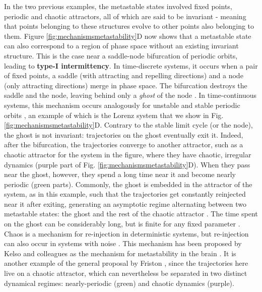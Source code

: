 \documentclass[reprint,superscriptaddress,showpacs,amsmath,amssymb,aps,floatfix,nolongbibliography]{revtex4-2}
\theoremstyle{definition}
\newcommand{\Emph}[1]{\textbf{#1}}
\begin{document}
In the two previous examples, the metastable states involved fixed points, periodic and chaotic attractors, all of which are said to be invariant - meaning that points belonging to these structures evolve to other points also belonging to them. Figure \ref{fig:mechanismsmetastability}D now shows that a metastable state can also correspond to a region of phase space without an existing invariant structure. This is the case near a saddle-node bifurcation of periodic orbits, leading to \Emph{type-I intermittency}. In time-discrete systems, it occurs when a pair of fixed points, a saddle (with attracting and repelling directions) and a node (only attracting directions) merge in phase space. The bifurcation destroys the saddle and the node, leaving behind only a \textit{ghost} of the node \cite{pomeau1979intermittency, pomeau1980intermittent, strogatz2002nonlinear}. In time-continuous systems, this mechanism occurs analogously for unstable and stable periodic orbits  \cite{medeiros2016trapping}, an example of which is the Lorenz system that we show in Fig. \ref{fig:mechanismsmetastability}D. Contrary to the stable limit cycle (or the node), the ghost is not invariant: trajectories on the ghost eventually exit it. Indeed, after the bifurcation, the trajectories converge to another attractor, such as a chaotic attractor for the system in the figure, where they have chaotic, irregular dynamics (purple part of Fig. \ref{fig:mechanismsmetastability}D). When they pass near the ghost, however, they spend a long time near it and become nearly periodic (green parts). Commonly, the ghost is embedded in the attractor of the system, as in this example, such that the trajectories get constantly reinjected near it after exiting, generating an asymptotic regime alternating between two metastable states: the ghost and the rest of the chaotic attractor \cite{pomeau1980intermittent}. The time spent on the ghost can be considerably long, but is finite for any fixed parameter \cite{pomeau1980intermittent}.
Chaos is a mechanism for re-injection in deterministic systems, but re-injection can also occur in systems with noise \cite{medeiros2016trapping}. 
This mechanism has been proposed by Kelso and colleagues as the mechanism for metastability in the brain \cite{kelso1991an, tognoli2014metastable}. It is another example of the general proposal by Friston \cite{friston2000transients}, since the trajectories here live on a chaotic attractor, which can nevertheless be separated in two distinct dynamical regimes: nearly-periodic (green) and chaotic dynamics (purple). 
\end{document}
